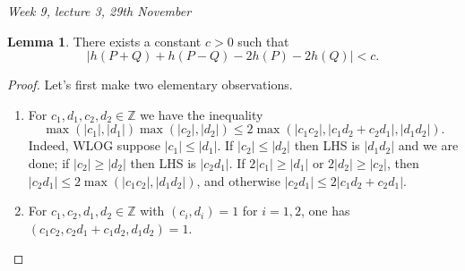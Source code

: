 \documentclass{article}
\newcommand{\Z}{\mathbb{Z}}
\theoremstyle{definition}
\newtheorem{lemma}[defn]{Lemma}
\begin{document}
\begin{flushright}
\textit{Week 9, lecture 3, 29th November}
\end{flushright}

\begin{lemma}
There exists a constant $c>0$ such that
\[
|h(P+Q)+h(P-Q)-2h(P)-2h(Q)|<c.
\]
\end{lemma}
\begin{proof}
Let's first make two elementary observations.
\begin{enumerate}
\item For $c_1,d_1,c_2,d_2\in\Z$ we have the inequality
\[
\max(|c_1|,|d_1|)\max(|c_2|,|d_2|)\leq 2\max(|c_1c_2|,|c_1d_2+c_2d_1|,|d_1d_2|).
\]
Indeed, WLOG suppose $|c_1|\leq |d_1|$. If $|c_2|\leq |d_2|$ then LHS is $|d_1d_2|$ and we are done; if $|c_2|\geq |d_2|$ then LHS is $|c_2d_1|$. If $2|c_1|\geq |d_1|$ or $2|d_2|\geq |c_2|$, then $|c_2d_1|\leq 2\max(|c_1c_2|,|d_1d_2|)$, and otherwise $|c_2d_1|\leq 2|c_1d_2+c_2d_1|$.
\item For $c_1,c_2,d_1,d_2\in\Z$ with $(c_i,d_i)=1$ for $i=1,2$, one has $(c_1c_2,c_2d_1+c_1d_2,d_1d_2)=1$.
\end{enumerate}


\end{proof}
\end{document}
